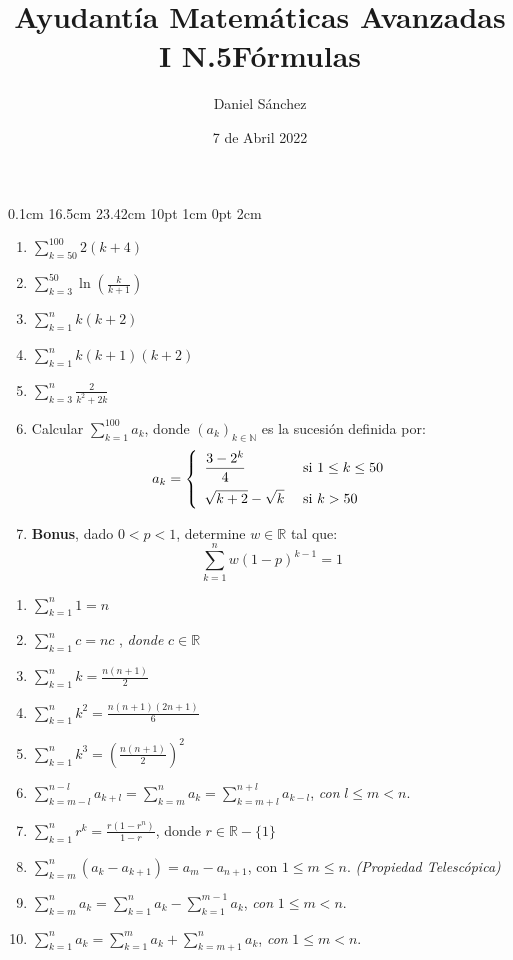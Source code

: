 \documentclass[12pt]{article}
\newcommand{\D}{\displaystyle}
\begin{document}
\setmargins{2.5cm}
{0.1cm}
{16.5cm}
{23.42cm}
{10pt}
{1cm}
{0pt}
{2cm}

\title{Ayudant\'ia Matem\'aticas Avanzadas I N.5}
\date{7 de Abril 2022}
\author{Daniel S\'anchez}
\maketitle

\begin{enumerate}
      \item $\D \sum_{k = 50}^{100} 2(k+4)$
      \item $\D \sum_{k = 3}^{50} \ln \left(\frac{k}{k+1}\right)$
      \item $\D \sum_{k = 1}^{n} k(k+2)$
      \item $\D \sum_{k = 1}^{n} k(k+1)(k+2)$
      \item $\D \sum_{k = 3}^{n} \frac{2}{k^2+2k}$
      \item Calcular $\D \sum_{k=1}^{100} a_k$, donde $(a_k)_{k \in \mathbb{N}}$ es la sucesi\'on definida por:
            $$a_k=\left\{
                  \begin{array}{ll}
                        \D \frac{3-2^k}{4}     & \mbox{ si } 1 \leq k \leq 50 \\[3\jot]
                        \D \sqrt{k+2}-\sqrt{k} & \mbox{ si } k > 50
                  \end{array}
                  \right.$$
      \item \textbf{Bonus}, dado $0 < p < 1$, determine $w \in \mathbb{R}$ tal que:
            $$\D \sum_{k = 1}^{n} w(1-p)^{k-1} = 1$$
\end{enumerate}


\pagebreak
\title{\LARGE{\textbf{F\'ormulas}}}
\maketitle
\begin{enumerate}
      \item $\D \sum_{k = 1}^{n} 1 = n $
      \item $\D \sum_{k = 1}^{n} c = nc $ , \textit{donde} $c \in \mathbb{R}$
      \item $\D \sum_{k = 1}^{n} k = \frac{n(n+1)}{2} $
      \item $\D \sum_{k = 1}^{n} k^2 = \frac{n(n+1)(2n+1)}{6} $
      \item $\D \sum_{k = 1}^{n} k^3 = {\left(\frac{n(n+1)}{2}\right)}^2 $
      \item $\D \sum_{k = m-l}^{n-l} a_{k+l} = \sum_{k = m}^{n} a_k = \sum_{k = m+l}^{n+l} a_{k-l}$, \textit{con} $l \leq m < n$.
      \item $\D \sum_{k = 1}^{n} r^k = \frac{r(1-r^n)}{1-r} $, donde $r \in \mathbb{R}-\{1\}$
      \item $\D \sum_{k = m}^{n} (a_k-a_{k+1}) = a_m-a_{n+1}$, con $1\leq m \leq n$. \textit{(Propiedad Telesc\'opica)}
      \item $\D \sum_{k = m}^{n} a_k = \sum_{k = 1}^{n} a_k - \sum_{k = 1}^{m-1} a_k $, \textit{con} $1 \leq m < n$.
      \item $\D \sum_{k = 1}^{n} a_k = \sum_{k = 1}^{m} a_k + \sum_{k = m+1}^{n} a_k $, \textit{con} $1 \leq m < n$.
\end{enumerate}
\end{document}
